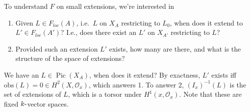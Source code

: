 \begin{center}
\end{center}

To understand \(F\) on small extensions, we're interested in

\begin{enumerate}
\def\labelenumi{\arabic{enumi}.}
\item
  Given \(L \in F_{loc}(A)\), i.e.~\(L\) on \(X_A\) restricting to
  \(L_0\), when does it extend to \(L' \in F_{loc}(A')\)? I.e., does
  there exist an \(L'\) on \(X_{A'}\) restricting to \(L\)?
\item
  Provided such an extension \(L'\) exists, how many are there, and what
  is the structure of the space of extensions?
\end{enumerate}

We have an \(L\in {\operatorname{Pic}}(X_A)\), when does it extend? By
exactness, \(L'\) exists iff
\(\text{obs}(L) = 0\in H^2(X, {\mathcal{O}}_x)\), which answers 1. To
answer 2, \((I_x)^{-1}(L)\) is the set of extensions of \(L\), which is
a torsor under \(H^1(x, {\mathcal{O}}_x)\). Note that these are fixed
\(k{\hbox{-}}\)vector spaces.


